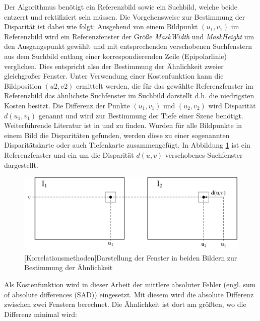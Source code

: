 \documentclass[times, 10pt,twocolumn]{article}
\begin{document}

Der Algorithmus benötigt ein Referenzbild sowie ein Suchbild, welche beide entzerrt und rektifiziert sein müssen. Die Vorgehensweise zur Bestimmung der Disparität ist dabei wie folgt: Ausgehend von einem Bildpunkt $(u_1,v_1)$ im Referenzbild wird ein Referenzfenster der Größe \textit{MaskWidth} und \textit{MaskHeight} um den Ausgangspunkt gewählt und mit entsprechenden verschobenen Suchfenstern aus dem Suchbild entlang einer korrespondierenden Zeile (Epipolarlinie) verglichen. Dies entspricht also der Bestimmung der Ähnlichkeit zweier gleichgroßer Fenster. Unter Verwendung einer Kostenfunktion kann die Bildposition $(u2, v2)$ ermittelt werden, die für das gewählte Referenzfenster im Referenzbild das ähnlichste Suchfenster im Suchbild darstellt d.h. die niedrigsten Kosten besitzt. Die Differenz der Punkte $(u_1,v_1)$ und $(u_2,v_2)$ wird Disparität $d(u_1,v_1)$ genannt und wird zur Bestimmung der Tiefe einer Szene benötigt. Weiterführende Literatur ist in \cite{Hartley.2003} und \cite{Schreer.2005} zu finden. Wurden für alle Bildpunkte in einem Bild die Disparitäten gefunden, werden diese zu einer sogenannten Disparitätskarte oder auch Tiefenkarte zusammengefügt. In Abbildung \ref{fig:korrelationsmethoden} ist ein Referenzfenster und ein um die Disparität $d(u,v)$ verschobenes Suchfenster dargestellt.

\begin{figure}[!ht]
	\centering
	\includegraphics[width=0.9\linewidth]{image/korrelationsverfahren.png}
	[Korrelationsmethoden]{Darstellung der Fenster in beiden Bildern zur Bestimmung der Ähnlichkeit}
	\label{fig:korrelationsmethoden}
\end{figure}


Als Kostenfunktion wird in dieser Arbeit der mittlere absoluter Fehler (engl. sum of absolute differences (SAD)) eingesetzt. Mit diesem wird die absolute Differenz zwischen zwei Fenstern berechnet. Die Ähnlichkeit ist dort am größten, wo die Differenz minimal wird:
\end{document}
